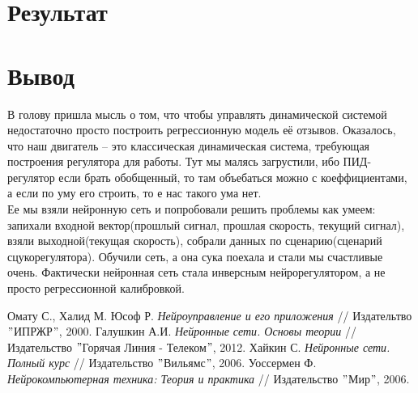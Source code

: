 \documentclass[14pt]{extreport}
\begin{document}
        \section{Результат}
        \section{Вывод}


            В голову пришла мысль о том, что чтобы управлять динамической системой недостаточно просто построить регрессионную модель её отзывов. Оказалось, что наш двигатель -- это классическая динамическая система, требующая построения регулятора для работы. Тут мы малясь загрустили, ибо ПИД-регулятор если брать обобщенный, то там объебаться можно с коеффициентами, а если по уму его строить, то е нас такого ума нет.\\
            Ее мы взяли нейронную сеть и попробовали решить проблемы как умеем: запихали входной вектор(прошлый сигнал, прошлая скорость, текущий сигнал), взяли выходной(текущая скорость), собрали данных по сценарию(сценарий сцукорегулятора). Обучили сеть, а она сука поехала и стали мы счастливые очень. Фактически нейронная сеть стала инверсным нейрорегулятором, а не просто регрессионной калибровкой.
\newpage
        \begin{thebibliography}{99}
             Омату С., Халид М. Юсоф Р. {\it Нейроуправление и его приложения} // Издательтво $"$ИПРЖР$"$, 2000.
             Галушкин А.И. {\it Нейронные сети. Основы теории} // Издательство $"$Горячая Линия - Телеком$"$, 2012.
             Хайкин С. {\it Нейронные сети. Полный курс} // Издательство $"$Вильямс$"$, 2006.
             Уоссермен Ф. {\it Нейрокомпьютерная техника: Теория и практика} // Издательство $"$Мир$"$, 2006.
        \end{thebibliography}
\end{document}
